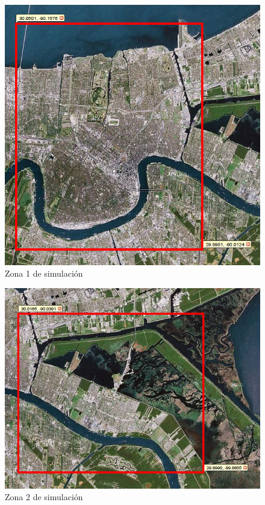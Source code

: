 \begin{figure}[H]
 \centering
 \includegraphics[width=120mm]{figuras/cap6/NOarea2.png}
 \caption{Zona 1 de simulación} \label{zona1}
\end{figure}

\begin{figure}[H]
 \centering
 \includegraphics[width=135mm]{figuras/cap6/NOarea3.png}
 \caption{Zona 2 de simulación} \label{zona2}
\end{figure}

